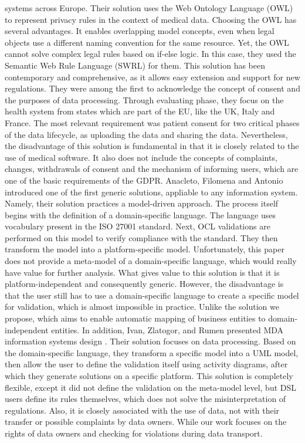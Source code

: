 \documentclass[11pt,english]{article}
\begin{document}
systems across Europe. Their solution uses the Web Ontology Language (OWL) \cite{owl} to represent privacy rules in the context of medical data. Choosing the OWL has several advantages. It enables overlapping model concepts, even when legal objects use a different naming convention for the same resource. Yet, the OWL cannot solve complex legal rules based on if-else logic. In this case, they used the Semantic Web Rule Language (SWRL) \cite{swrl} for them. This solution has been contemporary and comprehensive, as it allows easy extension and support for new regulations. They were among the first to acknowledge the concept of consent and the purposes of data processing. Through evaluating phase, they focus on the health system from states which are part of the EU, like the UK, Italy and France. The most relevant requirement was patient consent for two critical phases of the data lifecycle, as uploading the data and sharing the data. Nevertheless, the disadvantage of this solution is fundamental in that it is closely related to the use of medical software. It also does not include the concepts of complaints, changes, withdrawals of consent and the mechanism of informing users, which are one of the basic requirements of the GDPR. \newline  Anacleto, Filomena and Antonio \cite{correia2017model} introduced one of the first generic solutions, appliable to any information system. Namely, their solution practices a model-driven approach. The process itself begins with the definition of a domain-specific language. The language uses vocabulary present in the ISO 27001 standard. Next, OCL validations are performed on this model to verify compliance with the standard. They then transform the model into a platform-specific model. Unfortunately, this paper does not provide a meta-model of a domain-specific language, which would really have value for further analysis. What gives value to this solution is that it is platform-independent and consequently generic. However, the disadvantage is that the user still has to use a domain-specific language to create a specific model for validation, which is almost impossible in practice. Unlike the solution we propose, which aims to enable automatic mapping of business entities to domain-independent entities. In addition, Ivan, Zlatogor, and Rumen presented MDA information systems design \cite{gaidarskimodel}. Their solution focuses on data processing. Based on the domain-specific language, they transform a specific model into a UML model, then allow the user to define the validation itself using activity diagrams, after which they generate solutions on a specific platform. This solution is completely flexible, except it did not define the validation on the meta-model level, but DSL users define its rules themselves, which does not solve the misinterpretation of regulations. Also, it is closely associated with the use of data, not with their transfer or possible complaints by data owners. While our work focuses on the rights of data owners and checking for violations during data transport.
\end{document}
